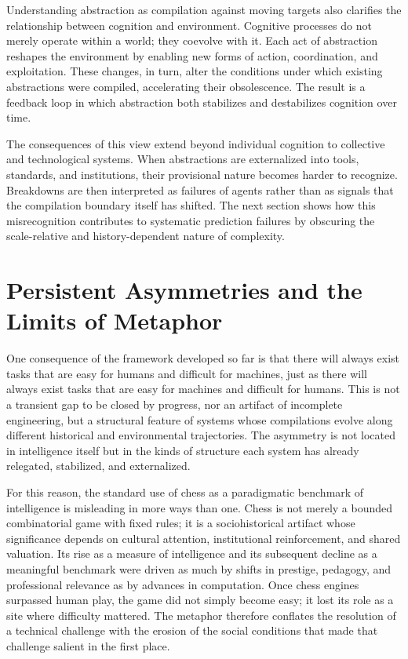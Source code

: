 \documentclass[12pt]{article}
\begin{document}
Understanding abstraction as compilation against moving targets also clarifies the relationship between cognition and environment. Cognitive processes do not merely operate within a world; they coevolve with it. Each act of abstraction reshapes the environment by enabling new forms of action, coordination, and exploitation. These changes, in turn, alter the conditions under which existing abstractions were compiled, accelerating their obsolescence. The result is a feedback loop in which abstraction both stabilizes and destabilizes cognition over time.

The consequences of this view extend beyond individual cognition to collective and technological systems. When abstractions are externalized into tools, standards, and institutions, their provisional nature becomes harder to recognize. Breakdowns are then interpreted as failures of agents rather than as signals that the compilation boundary itself has shifted. The next section shows how this misrecognition contributes to systematic prediction failures by obscuring the scale-relative and history-dependent nature of complexity.

\section{Persistent Asymmetries and the Limits of Metaphor}

One consequence of the framework developed so far is that there will always exist tasks that are easy for humans and difficult for machines, just as there will always exist tasks that are easy for machines and difficult for humans. This is not a transient gap to be closed by progress, nor an artifact of incomplete engineering, but a structural feature of systems whose compilations evolve along different historical and environmental trajectories. The asymmetry is not located in intelligence itself but in the kinds of structure each system has already relegated, stabilized, and externalized.

For this reason, the standard use of chess as a paradigmatic benchmark of intelligence is misleading in more ways than one. Chess is not merely a bounded combinatorial game with fixed rules; it is a sociohistorical artifact whose significance depends on cultural attention, institutional reinforcement, and shared valuation. Its rise as a measure of intelligence and its subsequent decline as a meaningful benchmark were driven as much by shifts in prestige, pedagogy, and professional relevance as by advances in computation. Once chess engines surpassed human play, the game did not simply become easy; it lost its role as a site where difficulty mattered. The metaphor therefore conflates the resolution of a technical challenge with the erosion of the social conditions that made that challenge salient in the first place.
\end{document}

